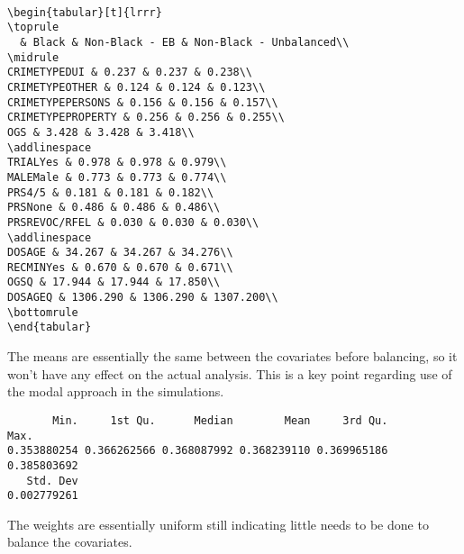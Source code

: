 \documentclass[
  letterpaper,
  DIV=11,
  numbers=noendperiod]{scrartcl}
\newenvironment{Shaded}{\begin{snugshade}}{\end{snugshade}}
\newcommand{\FunctionTok}[1]{\textcolor[rgb]{0.28,0.35,0.67}{#1}}
\newcommand{\NormalTok}[1]{\textcolor[rgb]{0.00,0.23,0.31}{#1}}
\newcommand{\OtherTok}[1]{\textcolor[rgb]{0.00,0.23,0.31}{#1}}
\newcommand{\SpecialCharTok}[1]{\textcolor[rgb]{0.37,0.37,0.37}{#1}}
\newcommand{\StringTok}[1]{\textcolor[rgb]{0.13,0.47,0.30}{#1}}
\begin{document}
\begin{verbatim}

\begin{tabular}[t]{lrrr}
\toprule
  & Black & Non-Black - EB & Non-Black - Unbalanced\\
\midrule
CRIMETYPEDUI & 0.237 & 0.237 & 0.238\\
CRIMETYPEOTHER & 0.124 & 0.124 & 0.123\\
CRIMETYPEPERSONS & 0.156 & 0.156 & 0.157\\
CRIMETYPEPROPERTY & 0.256 & 0.256 & 0.255\\
OGS & 3.428 & 3.428 & 3.418\\
\addlinespace
TRIALYes & 0.978 & 0.978 & 0.979\\
MALEMale & 0.773 & 0.773 & 0.774\\
PRS4/5 & 0.181 & 0.181 & 0.182\\
PRSNone & 0.486 & 0.486 & 0.486\\
PRSREVOC/RFEL & 0.030 & 0.030 & 0.030\\
\addlinespace
DOSAGE & 34.267 & 34.267 & 34.276\\
RECMINYes & 0.670 & 0.670 & 0.671\\
OGSQ & 17.944 & 17.944 & 17.850\\
DOSAGEQ & 1306.290 & 1306.290 & 1307.200\\
\bottomrule
\end{tabular}
\end{verbatim}

The means are essentially the same between the covariates before
balancing, so it won't have any effect on the actual analysis. This is a
key point regarding use of the modal approach in the simulations.

\begin{Shaded}
\end{Shaded}

\begin{verbatim}
       Min.     1st Qu.      Median        Mean     3rd Qu.        Max. 
0.353880254 0.366262566 0.368087992 0.368239110 0.369965186 0.385803692 
   Std. Dev 
0.002779261 
\end{verbatim}

The weights are essentially uniform still indicating little needs to be
done to balance the covariates.
\end{document}
